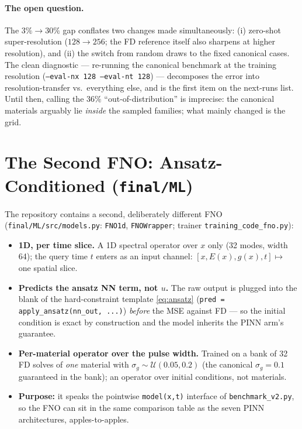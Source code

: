 \documentclass[11pt,a4paper]{article}
\begin{document}
\paragraph{The open question.} The $3\% \to 30\%$ gap conflates two changes
made simultaneously: (i) zero-shot super-resolution ($128 \to 256$; the FD
reference itself also sharpens at higher resolution), and (ii) the switch from
random draws to the fixed canonical cases. The clean diagnostic --- re-running
the canonical benchmark at the training resolution
(\texttt{--eval-nx 128 --eval-nt 128}) --- decomposes the error into
resolution-transfer vs.\ everything else, and is the first item on the
next-runs list. Until then, calling the 36\% ``out-of-distribution'' is
imprecise: the canonical materials arguably lie \emph{inside} the sampled
families; what mainly changed is the grid.

\section{The Second FNO: Ansatz-Conditioned (\texttt{final/ML})}

The repository contains a second, deliberately different FNO
(\texttt{final/ML/src/models.py}: \texttt{FNO1d}, \texttt{FNOWrapper};
trainer \texttt{training\_code\_fno.py}):

\begin{itemize}[nosep]
  \item \textbf{1D, per time slice.} A 1D spectral operator over $x$ only
        (32 modes, width 64); the query time $t$ enters as an input channel:
        $[x, E(x), g(x), t] \mapsto$ one spatial slice.
  \item \textbf{Predicts the ansatz NN term, not $u$.} The raw output is plugged
        into the blank of the hard-constraint template \eqref{eq:ansatz}
        (\texttt{pred = apply\_ansatz(nn\_out, ...)}) \emph{before} the MSE
        against FD --- so the initial condition is exact by construction and the
        model inherits the PINN arm's guarantee.
  \item \textbf{Per-material operator over the pulse width.} Trained on a bank
        of 32 FD solves of \emph{one} material with
        $\sigma_g \sim \mathcal{U}(0.05, 0.2)$ (the canonical $\sigma_g = 0.1$
        guaranteed in the bank); an operator over initial conditions, not materials.
  \item \textbf{Purpose:} it speaks the pointwise \texttt{model(x,t)} interface
        of \texttt{benchmark\_v2.py}, so the FNO can sit in the same comparison
        table as the seven PINN architectures, apples-to-apples.
\end{itemize}
\end{document}
